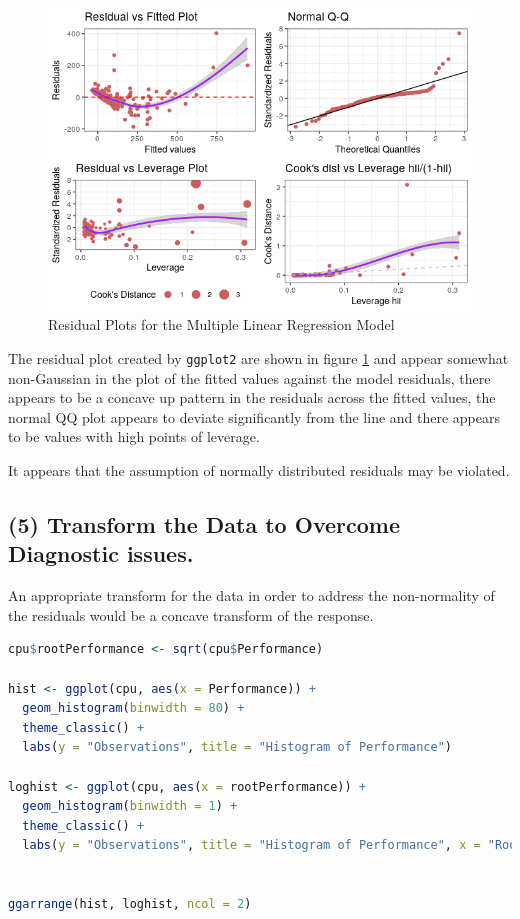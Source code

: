 \documentclass[
]{article}
\begin{document}
\begin{figure}
	\centering
	\includegraphics[width=0.7\linewidth]{SecAssignment_files/figure-html/unnamed-chunk-19-1.png}
	\caption{Residual Plots for the Multiple Linear Regression Model}
	\label{MultLinResP}
\end{figure}

\newpage

The residual plot created by \verb|ggplot2| are shown in figure \ref{MultLinResP} and appear somewhat non-Gaussian in the plot of the fitted
values against the model residuals, there appears to be a concave up
pattern in the residuals across the fitted values, the normal QQ plot
appears to deviate significantly from the line and there appears to be
values with high points of leverage.

It appears that the assumption of normally distributed residuals may be
violated.

\hypertarget{transform-the-data-to-overcome-diagnostic-issues.}{%
\subsection{(5) Transform the Data to Overcome Diagnostic
issues.}\label{transform-the-data-to-overcome-diagnostic-issues.}}

An appropriate transform for the data in order to address the
non-normality of the residuals would be a concave transform of the
response.

\begin{lstlisting}[language=R]
cpu$rootPerformance <- sqrt(cpu$Performance)

hist <- ggplot(cpu, aes(x = Performance)) +
  geom_histogram(binwidth = 80) +
  theme_classic() +
  labs(y = "Observations", title = "Histogram of Performance")

loghist <- ggplot(cpu, aes(x = rootPerformance)) +
  geom_histogram(binwidth = 1) +
  theme_classic() +
  labs(y = "Observations", title = "Histogram of Performance", x = "Root-Performance")


ggarrange(hist, loghist, ncol = 2)
\end{lstlisting}
\end{document}
